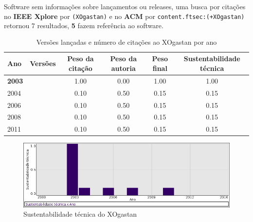 Software sem informações sobre lançamentos ou releases,
uma busca por citações no {\bf IEEE Xplore} por
\texttt{(XOgastan)}
e no {\bf ACM} por
\texttt{content.ftsec:(+XOgastan)}
retornou
7 resultados,
{\bf 5} fazem referência ao software.


\begin{table}[H]
\caption{Versões lançadas e número de citações ao XOgastan por ano}
\centering
\begin{tabular}{| l | c | c | c | c | c |}
  \hline
  Ano & Versões & Peso da citação & Peso da autoria & Peso final & Sustentabilidade técnica \\
  \hline
            {\bf 2003}
          &
          
          &
          1.00
          &
          0.00
          &
          1.00
          &
            {\color{blue} 1.00}
          \\
\hline
            2004
          &
          
          &
          0.10
          &
          0.50
          &
          0.15
          &
            {\color{red} 0.15}
          \\
\hline
            2006
          &
          
          &
          0.10
          &
          0.50
          &
          0.15
          &
            {\color{red} 0.15}
          \\
\hline
            2008
          &
          
          &
          0.10
          &
          0.50
          &
          0.15
          &
            {\color{red} 0.15}
          \\
\hline
            2011
          &
          
          &
          0.10
          &
          0.50
          &
          0.15
          &
            {\color{red} 0.15}
          \\
\hline
\end{tabular}
\end{table}

\begin{figure}[h]
  \center
  \includegraphics[scale=0.50]{result-documents/charts/xogastan.png}
  \caption{Sustentabilidade técnica do XOgastan}
\end{figure}


